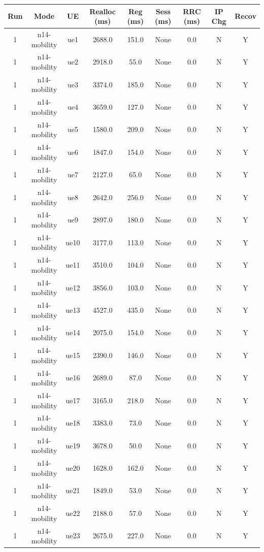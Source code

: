 \begin{table}[ht]
\centering
\begin{tabular}{|c|c|c|c|c|c|c|c|c|}
\hline
Run & Mode & UE & Realloc (ms) & Reg (ms) & Sess (ms) & RRC (ms) & IP Chg & Recov \\
\hline
1 & n14-mobility & ue1 & 2688.0 & 151.0 & None & 0.0 & N & Y \\
1 & n14-mobility & ue2 & 2918.0 & 55.0 & None & 0.0 & N & Y \\
1 & n14-mobility & ue3 & 3374.0 & 185.0 & None & 0.0 & N & Y \\
1 & n14-mobility & ue4 & 3659.0 & 127.0 & None & 0.0 & N & Y \\
1 & n14-mobility & ue5 & 1580.0 & 209.0 & None & 0.0 & N & Y \\
1 & n14-mobility & ue6 & 1847.0 & 154.0 & None & 0.0 & N & Y \\
1 & n14-mobility & ue7 & 2127.0 & 65.0 & None & 0.0 & N & Y \\
1 & n14-mobility & ue8 & 2642.0 & 256.0 & None & 0.0 & N & Y \\
1 & n14-mobility & ue9 & 2897.0 & 180.0 & None & 0.0 & N & Y \\
1 & n14-mobility & ue10 & 3177.0 & 113.0 & None & 0.0 & N & Y \\
1 & n14-mobility & ue11 & 3510.0 & 104.0 & None & 0.0 & N & Y \\
1 & n14-mobility & ue12 & 3856.0 & 103.0 & None & 0.0 & N & Y \\
1 & n14-mobility & ue13 & 4527.0 & 435.0 & None & 0.0 & N & Y \\
1 & n14-mobility & ue14 & 2075.0 & 154.0 & None & 0.0 & N & Y \\
1 & n14-mobility & ue15 & 2390.0 & 146.0 & None & 0.0 & N & Y \\
1 & n14-mobility & ue16 & 2689.0 & 87.0 & None & 0.0 & N & Y \\
1 & n14-mobility & ue17 & 3165.0 & 218.0 & None & 0.0 & N & Y \\
1 & n14-mobility & ue18 & 3383.0 & 73.0 & None & 0.0 & N & Y \\
1 & n14-mobility & ue19 & 3678.0 & 50.0 & None & 0.0 & N & Y \\
1 & n14-mobility & ue20 & 1628.0 & 162.0 & None & 0.0 & N & Y \\
1 & n14-mobility & ue21 & 1849.0 & 53.0 & None & 0.0 & N & Y \\
1 & n14-mobility & ue22 & 2188.0 & 57.0 & None & 0.0 & N & Y \\
1 & n14-mobility & ue23 & 2675.0 & 227.0 & None & 0.0 & N & Y \\

\end{tabular}
\end{table}
